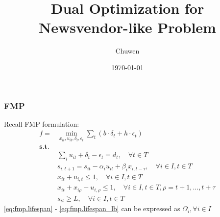 

\title{Dual Optimization for Newsvendor-like Problem}
\author{Chuwen}
\date{\today}


\frame{\titlepage}


\begin{frame}
  \frametitle{FMP}
  Recall FMP formulation:
  \begin{align}
    \label{eq:fmp.obj}  f =    & \min_{x_{it}, u_{it}, \delta_t, \epsilon_t} \sum_t (b\cdot  \delta_t + h \cdot \epsilon_t)                                                            \\
    \nonumber \mathbf{s.t.}    &                                                                                                                                                       \\
    \label{eq:fmp.demand}      & \sum_i u_{it} + \delta_t - \epsilon_t = d_t                                                ,\quad\forall t \in T                                      \\
    \label{eq:fmp.lifespan}    & s_{i, t+1} =  s_{i t}  - \alpha_i  u_{it} + \beta_i  x_{i, t- \tau}                        ,\quad\forall i \in I, t \in T                             \\
    \label{eq:fmp.work_or_not} & x_{it} +  u_{i, t} \le 1                                                                  ,\quad \forall i \in I, t \in T                             \\
    \label{eq:fmp.leadtime}    & x_{it} + x_{i\rho} + u_{i, \rho} \le 1                                                     ,\quad \forall i \in I,  t\in T, \rho = t + 1, ..., t+\tau \\
    \label{eq:fmp.lifespan_lb} & s_{i t} \ge L                                                                              ,\quad \forall i \in I, t \in T
  \end{align}
  \eqref{eq:fmp.lifespan} - \eqref{eq:fmp.lifespan_lb} can be expressed as \(\Omega_i, \forall i \in I\)
\end{frame}

